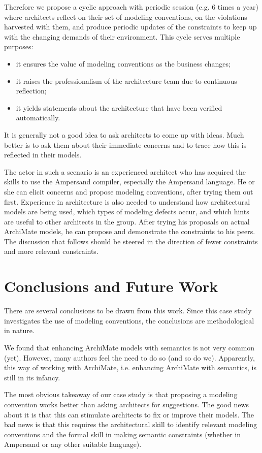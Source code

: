 \documentclass[sn-vancouver]{sn-jnl}%
\theoremstyle{thmstyleone}%
\theoremstyle{thmstyletwo}%
\theoremstyle{thmstylethree}%
\begin{document}
Therefore we propose a cyclic approach with periodic session (e.g. 6 times a year) where architects reflect on their set of modeling conventions,
on the violations harvested with them, and produce periodic updates of the constraints to keep up with the changing demands of their environment.
This cycle serves multiple purposes:
\begin{itemize}
   \item it ensures the value of modeling conventions as the business changes;
   \item it raises the professionalism of the architecture team due to continuous reflection;
   \item it yields statements about the architecture that have been verified automatically.
\end{itemize}

It is generally not a good idea to ask architects to come up with ideas.
Much better is to ask them about their immediate concerns and to trace how this is reflected in their models.

The actor in such a scenario is an experienced architect who has acquired the skills to use the Ampersand compiler, especially the Ampersand language.
He or she can elicit concerns and propose modeling conventions, after trying them out first.
Experience in architecture is also needed to understand how architectural models are being used,
which types of modeling defects occur,
and which hints are useful to other architects in the group.
After trying his proposals on actual ArchiMate models, he can propose and demonstrate the constraints to his peers.
The discussion that follows should be steered in the direction of fewer constraints and more relevant constraints.

\section{Conclusions and Future Work}\label{conclusion}
There are several conclusions to be drawn from this work.
Since this case study investigates the use of modeling conventions, the conclusions are methodological in nature.

We found that enhancing ArchiMate models with semantics is not very common (yet).
However, many authors feel the need to do so (and so do we).
Apparently, this way of working with ArchiMate, i.e. enhancing ArchiMate with semantics, is still in its infancy.

The most obvious takeaway of our case study is that proposing a modeling convention works better than asking architects for suggestions.
The good news about it is that this can stimulate architects to fix or improve their models.
The bad news is that this requires the architectural skill to identify relevant modeling conventions and the formal skill in making semantic constraints
(whether in Ampersand or any other suitable language).
\end{document}
